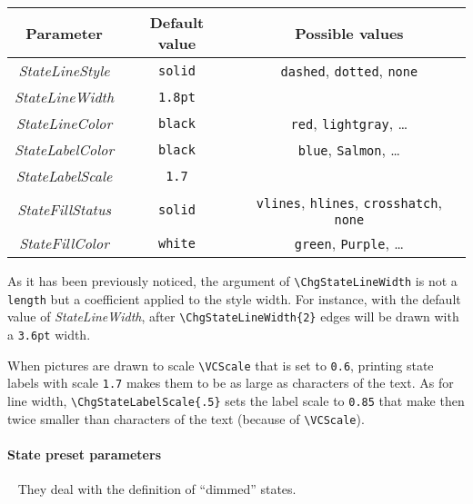 \documentclass[11pt,twoside]{article}
\begin{document}
\begin{center}
\begin{tabular}{c|c|c|}
Parameter & Default value & Possible values\\
\hline
\textit{StateLineStyle} & \texttt{solid} & \texttt{dashed}, \texttt{dotted}, \texttt{none}\\
\hline
\textit{StateLineWidth} & \texttt{1.8pt} &\\
\hline
\textit{StateLineColor} & \texttt{black} & \texttt{red}, \texttt{lightgray}, \ldots\\
\hline
\textit{StateLabelColor} & \texttt{black} & \texttt{blue}, \texttt{Salmon}, \ldots\\
\hline
\textit{StateLabelScale} & \texttt{1.7} &\\
\hline
\textit{StateFillStatus} & \texttt{solid} & \texttt{vlines}, \texttt{hlines}, \texttt{crosshatch}, \texttt{none}\\
\hline
\textit{StateFillColor} & \texttt{white} & \texttt{green}, \texttt{Purple}, \ldots\\
\hline
\end{tabular}
\end{center}

As it has been previously noticed, the argument of \verb+\ChgStateLineWidth+
is not a \texttt{length} but a coefficient applied to the style width.
For instance, with the default value of \textit{StateLineWidth}, 
after \verb+\ChgStateLineWidth{2}+
edges will be drawn with a \texttt{3.6pt} width.

When pictures are drawn to scale \verb+\VCScale+ that is set to \texttt{0.6},
printing state labels with scale \texttt{1.7} makes them to be as large
as characters of the text. As for line width, \verb+\ChgStateLabelScale{.5}+
sets the label scale to \texttt{0.85} that make then twice smaller
than characters of the text (because of \verb+\VCScale+).

\clearpage 
\paragraph{State preset parameters}
~
They deal with the definition of ``dimmed'' states.
\end{document}
